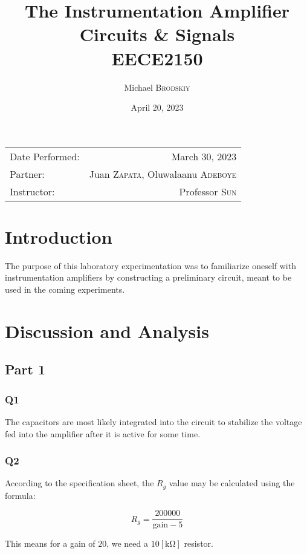 \documentclass[
	letterpaper, %
	10pt, %
]{CSUniSchoolLabReport}
\title{The Instrumentation Amplifier\\ Circuits \& Signals \\ EECE2150} %
\author{Michael \textsc{Brodskiy}}
\date{April 20, 2023} %
\begin{document}
\maketitle %

\begin{center}
	\begin{tabular}{l r}
		Date Performed: & March 30, 2023 \\ %
        Partner: & Juan \textsc{Zapata}, Oluwalaanu \textsc{Adeboye} \\ %
		Instructor: & Professor \textsc{Sun} %
	\end{tabular}
\end{center}

\setcounter{section}{-1}

\section{Introduction}

The purpose of this laboratory experimentation was to familiarize oneself with instrumentation amplifiers by constructing a preliminary circuit, meant to be used in the coming experiments.

\section{Discussion and Analysis}

\subsection{Part 1}

\subsubsection{Q1} The capacitors are most likely integrated into the circuit to stabilize the voltage fed into the amplifier after it is active for some time.

\subsubsection{Q2} According to the specification sheet, the $R_g$ value may be calculated using the formula:

$$R_g=\frac{200000}{\text{gain}-5}$$

This means for a gain of $20$, we need a $10[\si{\kilo\ohm}]$ resistor.
\end{document}
